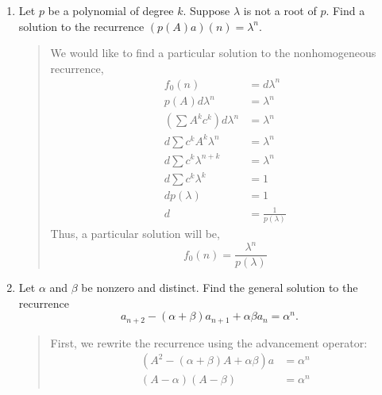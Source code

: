 \documentclass[letter]{article}
\begin{document}
\begin{enumerate}
		\newpage
        \item 
        Let $p$ be a polynomial of degree $k$. Suppose $\lambda$ is not a root of $p$. Find a solution to the recurrence $(p(A)a)(n) = \lambda^n$.
		\begin{quote}
		    We would like to find a particular solution to the nonhomogeneous recurrence,  
		    \begin{align*}
		        f_0(n) &= d \lambda^n \\
                p(A) d \lambda^n &= \lambda^n \\
                (\sum A^k c^k) d \lambda^n &= \lambda^n \\
                d \sum c^k A^k \lambda^n &= \lambda^n \\
                d \sum c^k \lambda^{n+k} &= \lambda^n \\
                d \sum c^k \lambda^k &= 1  \\
                d p(\lambda) &= 1  \\
                d &= \frac{1}{p(\lambda)} 		        
		    \end{align*}
		    Thus, a particular solution will be,
		    \[
		        f_0(n) = \frac{ \lambda^n}{p(\lambda)}
		    \]

            
		\end{quote}
		
		\newpage
        \item 
        Let $\alpha$ and $\beta$ be nonzero and distinct. Find the general solution to the recurrence 
        \[
            a_{n+2} - (\alpha + \beta)a_{n+1} + \alpha\beta a_n = \alpha^n.
		\]
		\begin{quote}
		    First, we rewrite the recurrence using the advancement operator:
		    \begin{align*}
		        (A^2 - (\alpha + \beta)A + \alpha \beta)a &= \alpha^n\\
		        (A- \alpha)(A-\beta) &=\alpha^n
		    \end{align*}
		    

\end{quote}
\end{enumerate}
\end{document}
